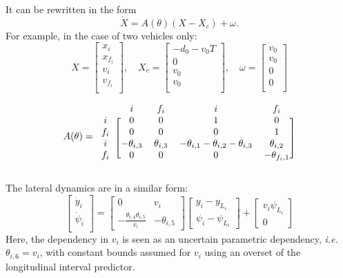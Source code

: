 \documentclass{article}
\begin{document}
It can be rewritten in the form $$\dot{X} = A(\theta)(X-X_c) + \omega.$$ For example, in the case of two vehicles only:
\begin{equation*}
X = \begin{bmatrix}
x_i \\
x_{f_i} \\
v_i \\
v_{f_i} \\
\end{bmatrix}
,\quad
X_c = \begin{bmatrix}
-d_0-v_0 T \\
0 \\
v_0\\
v_0 \\
\end{bmatrix}
,\quad
\omega = \begin{bmatrix}
v_0 \\
v_0 \\
0\\
0\\
\end{bmatrix}
\end{equation*}

\begin{equation*}
A(\theta)
=
\begin{blockarray}{ccccc}
& i & f_i & i & f_i \\
\begin{block}{c[cccc]}
i & 0 & 0 & 1 & 0 \\
f_i & 0 & 0 & 0 & 1 \\
i & -\theta_{i,3} & \theta_{i,3} & -\theta_{i,1}-\theta_{i,2}-\theta_{i,3} & \theta_{i,2} \\
f_i & 0 & 0 & 0 & -\theta_{f_i,1} \\
\end{block}
\end{blockarray}
\end{equation*}

The lateral dynamics are in a similar form:
\begin{equation*}
\begin{bmatrix}
\dot{y}_i \\
\dot{\psi}_i \\
\end{bmatrix}
=
\begin{bmatrix}
0 & v_i \\
-\frac{\theta_{i,4} \theta_{i,5}}{v_i} & -\theta_{i,5}
\end{bmatrix}
\begin{bmatrix}
y_i - y_{L_i} \\
\psi_i - \psi_{L_i}
\end{bmatrix}
+
\begin{bmatrix}
v_i\psi_{L_i} \\
0
\end{bmatrix}
\end{equation*}
Here, the dependency in $v_i$ is seen as an uncertain parametric dependency, \emph{i.e.} $\theta_{i,6}=v_i$, with constant bounds assumed for $v_i$ using an overset of the longitudinal interval predictor.
\end{document}
